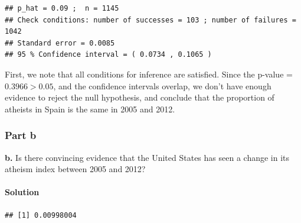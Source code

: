\documentclass[]{article}
\newenvironment{Shaded}{\begin{snugshade}}{\end{snugshade}}
\newcommand{\KeywordTok}[1]{\textcolor[rgb]{0.13,0.29,0.53}{\textbf{#1}}}
\newcommand{\StringTok}[1]{\textcolor[rgb]{0.31,0.60,0.02}{#1}}
\newcommand{\CommentTok}[1]{\textcolor[rgb]{0.56,0.35,0.01}{\textit{#1}}}
\newcommand{\OperatorTok}[1]{\textcolor[rgb]{0.81,0.36,0.00}{\textbf{#1}}}
\newcommand{\NormalTok}[1]{#1}
\let\oldparagraph\paragraph
\renewcommand{\paragraph}[1]{\oldparagraph{#1}\mbox{}}
\begin{document}
\begin{verbatim}
## p_hat = 0.09 ;  n = 1145 
## Check conditions: number of successes = 103 ; number of failures = 1042 
## Standard error = 0.0085 
## 95 % Confidence interval = ( 0.0734 , 0.1065 )
\end{verbatim}

First, we note that all conditions for inference are satisfied. Since
the p-value = \(0.3966 > 0.05\), and the confidence intervals overlap,
we don't have enough evidence to reject the null hypothesis, and
conclude that the proportion of atheists in Spain is the same in 2005
and 2012.

\subsubsection{Part b}\label{part-b}

\textbf{b.} Is there convincing evidence that the United States has seen
a change in its atheism index between 2005 and 2012?

\paragraph{Solution}\label{solution-12}

\begin{Shaded}
\end{Shaded}

\begin{verbatim}
## [1] 0.00998004
\end{verbatim}

\begin{Shaded}
\end{Shaded}
\end{document}
